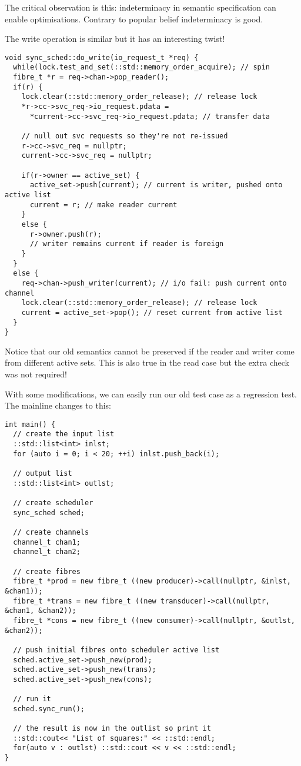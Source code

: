 \documentclass[oneside]{book}
\begin{document}
The critical observation is this: indeterminacy in semantic
specification can enable optimisations. Contrary to popular
belief indeterminacy is good.

The write operation is similar but it has an interesting twist!

\begin{verbatim}
void sync_sched::do_write(io_request_t *req) {
  while(lock.test_and_set(::std::memory_order_acquire); // spin
  fibre_t *r = req->chan->pop_reader();
  if(r) {
    lock.clear(::std::memory_order_release); // release lock
    *r->cc->svc_req->io_request.pdata = 
      *current->cc->svc_req->io_request.pdata; // transfer data

    // null out svc requests so they're not re-issued
    r->cc->svc_req = nullptr;
    current->cc->svc_req = nullptr;

    if(r->owner == active_set) {
      active_set->push(current); // current is writer, pushed onto active list
      current = r; // make reader current
    }
    else {
      r->owner.push(r);
      // writer remains current if reader is foreign
    }
  }
  else {
    req->chan->push_writer(current); // i/o fail: push current onto channel
    lock.clear(::std::memory_order_release); // release lock
    current = active_set->pop(); // reset current from active list
  }
}

\end{verbatim}

Notice that our old semantics cannot be preserved if the reader and
writer come from different active sets. This is also true in the read
case but the extra check was not required!

With some modifications, we can easily run our old test case as a regression test.
The mainline changes to this:

\begin{verbatim}
int main() {
  // create the input list
  ::std::list<int> inlst;
  for (auto i = 0; i < 20; ++i) inlst.push_back(i);

  // output list
  ::std::list<int> outlst;

  // create scheduler
  sync_sched sched;

  // create channels
  channel_t chan1;
  channel_t chan2;

  // create fibres
  fibre_t *prod = new fibre_t ((new producer)->call(nullptr, &inlst, &chan1));
  fibre_t *trans = new fibre_t ((new transducer)->call(nullptr, &chan1, &chan2));
  fibre_t *cons = new fibre_t ((new consumer)->call(nullptr, &outlst, &chan2));

  // push initial fibres onto scheduler active list
  sched.active_set->push_new(prod);
  sched.active_set->push_new(trans);
  sched.active_set->push_new(cons);
 
  // run it
  sched.sync_run();

  // the result is now in the outlist so print it
  ::std::cout<< "List of squares:" << ::std::endl;
  for(auto v : outlst) ::std::cout << v << ::std::endl;
} 
\end{verbatim}
\end{document}
